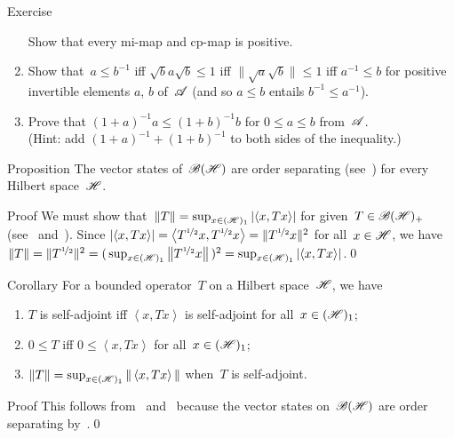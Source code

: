 \documentclass[a]{subfiles}
\begin{document}
\begin{parsec}
\begin{point}{Exercise}
\begin{enumerate}
Show that every mi-map and cp-map is positive.
\item
Show that~$a\leq b^{-1}$ 
iff $\sqrt{b}a\sqrt{b}\leq 1$
iff $\|\sqrt{a}\sqrt{b}\|\leq 1$
iff $a^{-1}\leq b$
for positive invertible elements $a$, $b$ of~$\mathscr{A}$
(and so $a\leq b$ entails $b^{-1}\leq a^{-1}$).
\item
Prove that $(1+a)^{-1}a\leq (1+b)^{-1}b$
for $0\leq a\leq b$ from~$\mathscr{A}$.\\
(Hint: add $(1+a)^{-1} + (1+b)^{-1}$
to both sides of the inequality.)
\end{enumerate}
\end{point}
\begin{point}{Proposition}%
The vector states
of~$\mathscr{B}(\mathscr{H})$
are order separating (see~)
for every Hilbert space~$\mathscr{H}$.
\begin{point}{Proof}%
We must show
that~$\|T\|=  \sup_{x\in (\mathscr{H})_1} 
\left|\left< x,Tx\right>\right|$
for given~$T\in\mathscr{B}(\mathscr{H})_+$
(see~ and~).
Since $\left|\left<x,Tx\right>\right|
=\left<T^{\nicefrac{1}{2}}x,T^{\nicefrac{1}{2}}x\right>
=\|T^{\nicefrac{1}{2}}x\|^2$
for all~$x\in \mathscr{H}$, 
we have $
\|T\| = \|T^{\nicefrac{1}{2}}\|^2
=(\,\sup_{x\in (\mathscr{H})_1}\left\|T^{\nicefrac{1}{2}}x\right\|\,)^2
=\sup_{x\in (\mathscr{H})_1} \left|\left<x,Tx\right>\right|$.\qed
\end{point}
\end{point}
\begin{point}{Corollary}%
For a bounded operator~$T$
on a Hilbert space~$\mathscr{H}$, we have
\begin{enumerate}
\item
$T$ is self-adjoint iff $\left<x,Tx\right>$
is self-adjoint for all~$x\in (\mathscr{H})_1$;
\item
$0\leq T$ iff $0\leq\left<x,Tx\right>$
for all~$x\in (\mathscr{H})_1$;
\item
	$\|T\|=\sup_{x\in (\mathscr{H})_1}\|\left<x,Tx\right>\|$
when~$T$ is self-adjoint.
\end{enumerate}
\begin{point}{Proof}%
This follows from~ 
and~
because the vector states on~$\mathscr{B}(\mathscr{H})$
are order separating 
by~.\qed
\end{point}
\end{point}
\end{parsec}
\end{document}
